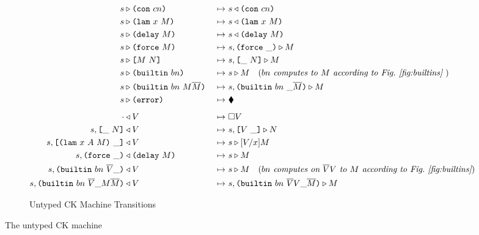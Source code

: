 \documentclass[../plutus-core-specification.tex]{subfiles}
\begin{document}
\begin{figure}[H]
\begin{subfigure}[c]{\linewidth}
\hspace{-1cm}\begin{minipage}{\linewidth}
\begin{alignat*}{2}
        \cksteps{\ckforward{s&}{\con{cn}}&} {&\ckbackward{s}{\con{cn}}}\\
        \cksteps{\ckforward{s&}{\lamU{x}{M}}&} {&\ckbackward{s}{\lamU{x}{M}}}\\
        \cksteps{\ckforward{s&}{\delay{M}}&} {&\ckbackward{s}{\delay{M}}}\\
        \cksteps{\ckforward{s&}{\force{M}}&} {&\ckforward{s, \inForceFrame{}}{M}}\\
        \cksteps{\ckforward{s&}{\appU{M}{N}}&} {&\ckforward{s, \inAppLeftFrame{N}}{M}}\\
        \cksteps{\ckforward{s&}{\builtinU{bn}{\!\!}}&} {&\ckforward{s}{M}}
        \quad (\textit{$bn$ computes to $M$ according to Fig.~\ref{fig:builtins} }) \\
       \cksteps{\ckforward{s&}{\builtinU{bn}{M \repetition{M}}}&} {&\ckforward{s, \inBuiltinU{bn}{}{\_}{\repetition{M}}}{M}}\\
       \cksteps{\ckforward{s&}{\errorU}&} {&\ckerror{}}\\
       \\[-10pt] %
        \cksteps{\ckbackward{\cdot&}{V}&} {&\square V}\\
        \cksteps{\ckbackward{s, \inAppLeftFrame{N}&}{V}&} {&\ckforward{s, \inAppRightFrame{V}}{N}}\\
        \cksteps{\ckbackward{s, \inAppRightFrame{\lam{x}{A}{M}}&}{V}&} {&\ckforward{s}{\subst{V}{x}{M}}}\\
        \cksteps{\ckbackward{s, \inForceFrame{}&}{\delay{M}}&} {&\ckforward{s}{M}}\\
        \cksteps{\ckbackward{s, \inBuiltinU{bn}{\repetition{V}}{\_}{}&}{V}&} {&\ckforward{s}{M}}
          \quad (\textit{$bn$ computes on $\repetition{V}V$ to $M$ according to Fig.~\ref{fig:builtins}})\\
          \cksteps{\ckbackward{s, \inBuiltinU{bn}{\repetition{V}}{\_}{M \repetition{M}}&}{V}&}
                  {&\ckforward{s, \inBuiltinU{bn}{\repetition{V} V}{\_}{\repetition{M}}}{M}}\\
    \end{alignat*}
\end{minipage}
    \caption{Untyped CK Machine Transitions}
    \label{fig:untyped-ck-transitions}
\end{subfigure}
\caption{The untyped CK machine}
\label{fig:untyped-ck-machine}
\end{figure}

\end{document}

